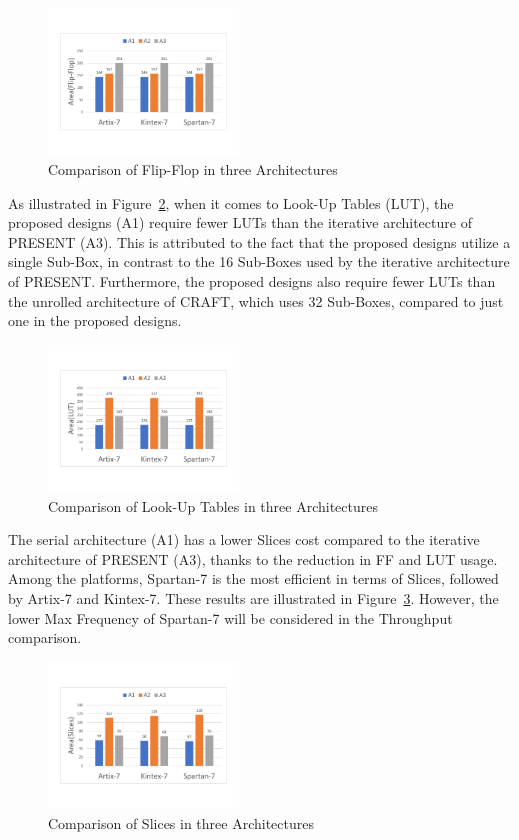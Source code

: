\documentclass[final,5p,times,twocolumn]{elsarticle}
\begin{document}
\begin{figure}
    \centering
    \includegraphics[width=0.45\textwidth]{./fig/compare-ff.pdf}
    \caption{Comparison of Flip-Flop in three Architectures}\label{compare_ff}
\end{figure}

As illustrated in Figure~\ref{compare_lut}, when it comes to Look-Up Tables (LUT), the proposed designs (A1) require fewer LUTs than the iterative architecture of PRESENT (A3). This is attributed to the fact that the proposed designs utilize a single Sub-Box, in contrast to the 16 Sub-Boxes used by the iterative architecture of PRESENT. Furthermore, the proposed designs also require fewer LUTs than the unrolled architecture of CRAFT, which uses 32 Sub-Boxes, compared to just one in the proposed designs.

\begin{figure}
    \centering
    \includegraphics[width=0.45\textwidth]{./fig/compare-lut.pdf}
    \caption{Comparison of Look-Up Tables in three Architectures}\label{compare_lut}
\end{figure}

The serial architecture (A1) has a lower Slices cost compared to the iterative architecture of PRESENT (A3), thanks to the reduction in FF and LUT usage. Among the platforms, Spartan-7 is the most efficient in terms of Slices, followed by Artix-7 and Kintex-7. These results are illustrated in Figure~\ref{compare-slices}. However, the lower Max Frequency of Spartan-7 will be considered in the Throughput comparison.

\begin{figure}
    \centering
    \includegraphics[width=0.45\textwidth]{./fig/compare-slices.pdf}
    \caption{Comparison of Slices in three Architectures}\label{compare-slices}
\end{figure}
\end{document}

